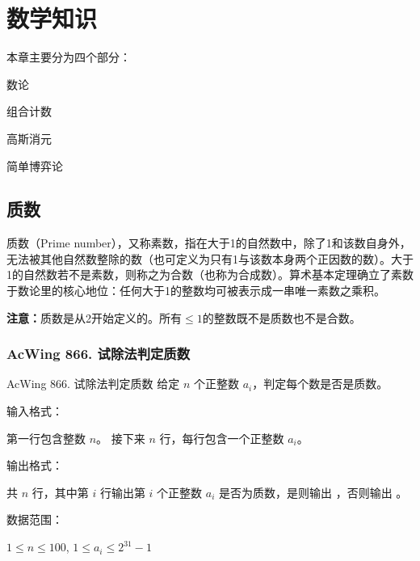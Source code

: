 \chapter{数学知识}
本章主要分为四个部分：
\begin{myenum}
    \item 数论
    \item 组合计数
    \item 高斯消元
    \item 简单博弈论
\end{myenum}


\section{质数}
质数（Prime number），又称素数，指在大于1的自然数中，除了1和该数自身外，无法被其他自然数整除的数（也可定义为只有1与该数本身两个正因数的数）。大于1的自然数若不是素数，则称之为合数（也称为合成数）。算术基本定理确立了素数于数论里的核心地位：任何大于1的整数均可被表示成一串唯一素数之乘积。

\textbf{注意：}质数是从2开始定义的。所有$\leq 1$的整数既不是质数也不是合数。

\subsection{AcWing 866. 试除法判定质数}
\begin{titledbox}{AcWing 866. 试除法判定质数}
    给定 $n$ 个正整数 $a_i$，判定每个数是否是质数。

    输入格式：

    第一行包含整数 $n$。 接下来 $n$ 行，每行包含一个正整数 $a_i$。

    输出格式：

    共 $n$ 行，其中第 $i$ 行输出第 $i$ 个正整数 $a_i$ 是否为质数，是则输出 ，否则输出 。

    数据范围：

    $1 \le n \le 100$, $1 \le a_i \le 2^{31}-1$

    \begin{inputblock}
         \\
         \\
    \end{inputblock}
    \begin{outputblock}
         \\
    \end{outputblock}
\end{titledbox}

